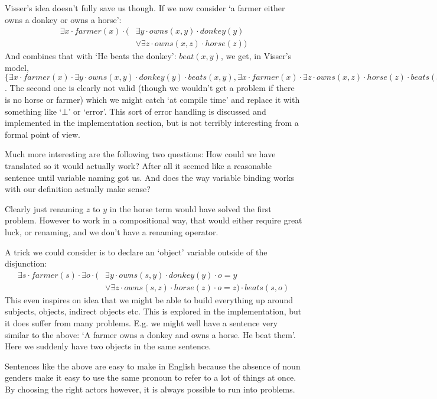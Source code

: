 \documentclass[12pt]{article}
\begin{document}
Visser's idea doesn't fully save us though. If we now consider `a farmer either owns a donkey or owns a horse':
\begin{align}
\exists x\cdot farmer(x)\cdot(&\exists y\cdot owns(x,y)\cdot donkey(y)\nonumber\\
                              &\vee \exists z\cdot owns(x,z)\cdot horse(z))
\end{align}
And combines that with `He beats the donkey': $beat(x,y)$, we get, in Visser's model, $\{\exists x\cdot farmer(x)\cdot\exists y\cdot owns(x,y)\cdot donkey(y)\cdot beats(x,y), \exists x\cdot farmer(x)\cdot\exists z\cdot owns(x,z)\cdot horse(z)\cdot beats(x,y)\}$. The second one is clearly not valid (though we wouldn't get a problem if there is no horse or farmer) which we might catch `at compile time' and replace it with something like `$\bot$' or `error'. This sort of error handling is discussed and implemented in the implementation section, but is not terribly interesting from a formal point of view.

Much more interesting are the following two questions: How could we have translated \label{owns_donkey_or_horse} so it would actually work? After all it seemed like a reasonable sentence until variable naming got us. And does the way variable binding works with our definition actually make sense?

Clearly just renaming $z$ to $y$ in the horse term would have solved the first problem. However to work in a compositional way, that would either require great luck, or renaming, and we don't have a renaming operator.

A trick we could consider is to declare an `object' variable outside of the disjunction:
\begin{align}
\exists s\cdot farmer(s)\cdot\exists o\cdot(
      &\exists y\cdot owns(s,y)\cdot donkey(y)\cdot o=y \nonumber\\
      &\vee \exists z\cdot owns(s,z)\cdot horse(z)\cdot o=z)\cdot beats(s,o)
\end{align}
%
This even inspires on idea that we might be able to build everything up around subjects, objects, indirect objects etc. This is explored in the implementation, but it does suffer from many problems. E.g. we might well have a sentence very similar to the above: `A farmer owns a donkey and owns a horse. He beat them'. Here we suddenly have two objects in the same sentence.

Sentences like the above are easy to make in English because the absence of noun genders make it easy to use the same pronoun to refer to a lot of things at once. By choosing the right actors however, it is always possible to run into problems.
\end{document}
